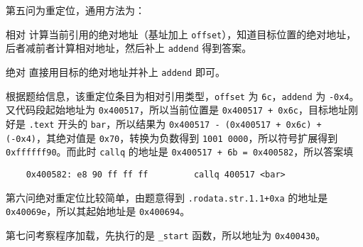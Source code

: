 \begin{problems}
        第五问为重定位，通用方法为：
        \begin{compactdesc}
            \item[相对] 计算当前引用的绝对地址（基址加上 \verb|offset|），知道目标位置的绝对地址，后者减前者计算相对地址，然后补上 \verb|addend| 得到答案。
            \item[绝对] 直接用目标的绝对地址并补上 \verb|addend| 即可。
        \end{compactdesc}
        根据题给信息，该重定位条目为相对引用类型，\verb|offset| 为 \verb|6c|，\verb|addend| 为 \verb|-0x4|。又代码段起始地址为 \verb|0x400517|，所以当前位置是 \verb|0x400517 + 0x6c|，目标地址刚好是 \verb|.text| 开头的 \verb|bar|，所以结果为 \verb|0x400517 - (0x400517 + 0x6c) + (-0x4)|，其绝对值是 \verb|0x70|，转换为负数得到 \verb|1001 0000|，所以符号扩展得到 \verb|0xffffff90|。而此时 \verb|callq| 的地址是 \verb|0x400517 + 6b = 0x400582|，所以答案填
        \begin{verbatim}
    0x400582: e8 90 ff ff ff         callq 400517 <bar>
        \end{verbatim}
        第六问绝对重定位比较简单，由题意得到 \verb|.rodata.str.1.1+0xa| 的地址是 \verb|0x40069e|，所以其起始地址是 \verb|0x400694|。

        第七问考察程序加载，先执行的是 \verb|_start| 函数，所以地址为 \verb|0x400430|。
    \end{problems}

